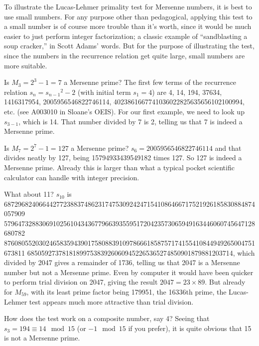 \documentclass[12pt]{article}
\begin{document}
To illustrate the Lucas-Lehmer primality test for Mersenne numbers, it is best to use small numbers. For any purpose other than pedagogical, applying this test to a small number is of course more trouble than it's worth, since it would be much easier to just perform integer factorization; a classic example of ``sandblasting a soup cracker,'' in Scott Adams' words. But for the purpose of illustrating the test, since the numbers in the recurrence relation get quite large, small numbers are more suitable.

Is $M_3 = 2^3 - 1 = 7$ a Mersenne prime? The first few terms of the recurrence relation $s_n = {s_{n - 1}}^2 - 2$ (with initial term $s_1 = 4$) are 4, 14, 194, 37634, 1416317954, 2005956546822746114, 4023861667741036022825635656102100994, etc. (see A003010 in Sloane's OEIS). For our first example, we need to look up $s_{3 - 1}$, which is 14. That number divided by 7 is 2, telling us that 7 is indeed a Mersenne prime.

Is $M_7 = 2^7 - 1 = 127$ a Mersenne prime? $s_6 = 2005956546822746114$ and that divides neatly by 127, being 15794933439549182 times 127. So 127 is indeed a Mersenne prime. Already this is larger than what a typical pocket scientific calculator can handle with integer precision.

What about 11? $s_{10}$ is 687296824066442772388374862317475309242471541086466717521926185830884874057909
579647328830691025610434367796639355951720423573065949163446060745647128680782
876080552030246583594390175808839109786661858757174155410844949265004751673811
68505927378181899753839260609452265365274850901879881203714, which divided by 2047 gives a remainder of 1736, telling us that 2047 is a Mersenne number but not a Mersenne prime. Even by computer it would have been quicker to perform trial division on 2047, giving the result $2047 = 23 \times 89$. But already for $M_{59}$, with its least prime factor being 179951, the 16336th prime, the Lucas-Lehmer test appears much more attractive than trial division.

How does the test work on a composite number, say 4? Seeing that $s_3 = 194 \equiv 14 \mod 15$ (or $-1 \mod 15$ if you prefer), it is quite obvious that 15 is not a Mersenne prime.
\end{document}
